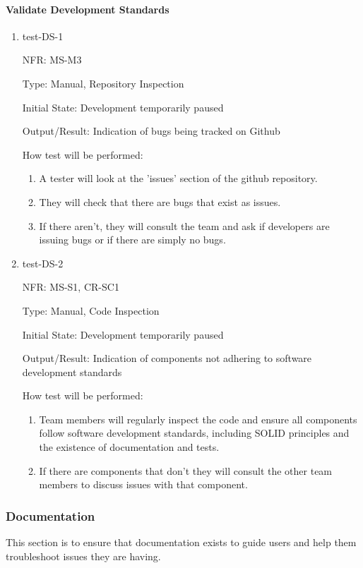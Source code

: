 \documentclass[12pt, titlepage]{article}
\begin{document}
\paragraph{Validate Development Standards}
\begin{enumerate}
  \item{test-DS-1}
  
  NFR: MS-M3

  Type: Manual, Repository Inspection

  Initial State: Development temporarily paused

  Output/Result: Indication of bugs being tracked on Github

  How test will be performed:
  \begin{enumerate}
    \item A tester will look at the 'issues' section of the github repository.
    \item They will check that there are bugs that exist as issues.
    \item If there aren't, they will consult the team and ask if developers are
    issuing bugs or if there are simply no bugs.
  \end{enumerate}


  \item{test-DS-2}
  
  NFR: MS-S1, CR-SC1

  Type: Manual, Code Inspection

  Initial State: Development temporarily paused

  Output/Result: Indication of components not adhering to software development standards

  How test will be performed:
  \begin{enumerate}
    \item Team members will regularly inspect the code and ensure all components 
    follow software development standards, including SOLID principles and the 
    existence of documentation and tests.
    \item If there are components that don't they will consult the other team 
    members to discuss issues with that component.
  \end{enumerate}
\end{enumerate}

\subsubsection{Documentation}
This section is to ensure that documentation exists to guide users and help them 
troubleshoot issues they are having.
\end{document}
